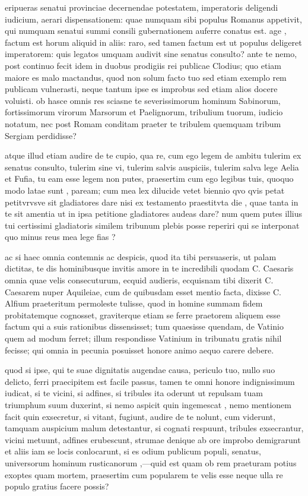  eripueras senatui provinciae decernendae potestatem, imperatoris deligendi iudicium, aerari dispensationem: quae numquam sibi populus Romanus appetivit, qui numquam senatui summi consili gubernationem auferre conatus est. age , factum est horum aliquid in aliis: raro, sed tamen factum est ut populus deligeret imperatorem: quis legatos umquam audivit sine senatus consulto? ante te nemo, post continuo fecit idem in duobus prodigiis rei publicae Clodius; quo etiam maiore es malo mactandus, quod non solum facto tuo sed etiam exemplo rem publicam vulnerasti, neque tantum ipse es improbus sed etiam alios docere voluisti. ob hasce omnis res sciasne te severissimorum hominum Sabinorum, fortissimorum virorum Marsorum et Paelignorum, tribulium tuorum, iudicio notatum, nec post Romam conditam praeter te tribulem quemquam tribum Sergiam perdidisse?

 atque illud etiam audire de te cupio, qua re, cum ego legem de ambitu tulerim ex senatus consulto, tulerim sine vi, tulerim salvis auspiciis, tulerim salva lege Aelia et Fufia, tu eam esse legem non putes, praesertim cum ego legibus tuis, quoquo modo latae sunt , paream; cum mea lex dilucide vetet biennio qvo qvis petat petitvrvsve sit gladiatores dare nisi ex testamento praestitvta die , quae tanta in te sit amentia ut in ipsa petitione gladiatores audeas dare? num quem putes illius tui certissimi gladiatoris similem tribunum plebis posse reperiri qui se interponat quo minus reus mea lege fias ?

 ac si haec omnia contemnis ac despicis, quod ita tibi persuaseris, ut palam dictitas, te dis hominibusque invitis amore in te incredibili quodam C. Caesaris omnia quae velis consecuturum, ecquid audieris, ecquisnam tibi dixerit C. Caesarem nuper Aquileiae, cum de quibusdam esset mentio facta, dixisse C. Alfium praeteritum permoleste tulisse, quod in homine summam fidem probitatemque cognosset, graviterque etiam se ferre praetorem aliquem esse factum qui a suis rationibus dissensisset; tum quaesisse quendam, de Vatinio quem ad modum ferret; illum respondisse Vatinium in tribunatu gratis nihil fecisse; qui omnia in pecunia posuisset honore animo aequo carere debere.

 quod si ipse, qui te suae dignitatis augendae causa, periculo tuo, nullo suo delicto, ferri praecipitem est facile passus, tamen te omni honore indignissimum iudicat, si te vicini, si adfines, si tribules ita oderunt ut repulsam tuam triumphum suum duxerint, si nemo aspicit quin ingemescat , nemo mentionem facit quin exsecretur, si vitant, fugiunt, audire de te nolunt, cum viderunt, tamquam auspicium malum detestantur, si cognati respuunt, tribules exsecrantur, vicini metuunt, adfines erubescunt, strumae denique ab ore improbo demigrarunt et aliis iam se locis conlocarunt, si es odium publicum populi, senatus, universorum hominum rusticanorum ,—quid est quam ob rem praeturam potius exoptes quam mortem, praesertim cum popularem te velis esse neque ulla re populo gratius facere possis?

